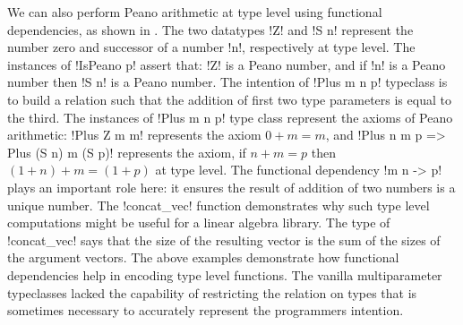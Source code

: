 \documentclass[format=acmsmall,manuscript,screen,nonacm,margin=1in,11pt]{acmart}
\begin{document}
We can also perform Peano arithmetic at type level using functional dependencies,
as shown in . The two datatypes !Z! and !S n!
represent the number zero and successor of a number !n!, respectively at type level.
The instances of !IsPeano p! assert that: !Z! is a Peano number, and if !n! is a Peano number
then !S n! is a Peano number. The intention of !Plus m n p! typeclass is to build a relation such that
the addition of first two type parameters is equal to the third. The instances of !Plus m n p!
type class represent the axioms of Peano arithmetic: !Plus Z m m! represents the
axiom $0 + m = m$, and !Plus n m p => Plus (S n) m (S p)! represents the axiom,
if $n + m = p$ then $(1 + n) + m = (1 + p)$ at type level. The functional dependency !m n -> p!
plays an important role here: it ensures the result of addition of two numbers is a unique number.
The !concat_vec! function demonstrates why such type level computations might be useful
for a linear algebra library. The type of !concat_vec! says that the size of the resulting
vector is the sum of the sizes of the argument vectors. %
The above examples demonstrate how functional dependencies help in encoding
type level functions. The vanilla multiparameter typeclasses lacked
the capability of restricting the relation on types that is sometimes necessary to accurately
represent the programmers intention.
\end{document}
